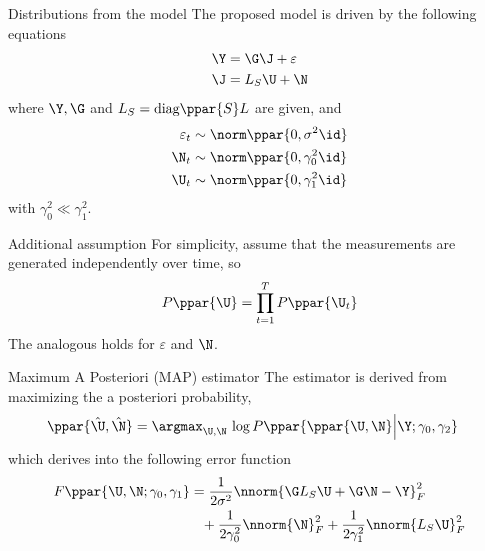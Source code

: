  {Distributions from the model}
The proposed model is driven by the following equations
\begin{align}
    \Y &= \G \J + \varepsilon \\
    \J &=  L_S \U + \N
\end{align}
where $\Y, \G$ and $L_S = \text{diag}\ppar{S} L$ are given, and
\begin{align}
    \varepsilon_t &\sim  \norm\ppar{0, \sigma^2 \id } \\
    \N_t &\sim  
    \norm\ppar{0, \gamma_0^2 \id } \\
    \U_t &\sim  
    \norm\ppar{0, \gamma_1^2 \id } 
\end{align}
with $\gamma_0^2 \ll \gamma_1^2$.
 


 {Additional assumption}
For simplicity, assume that
the measurements are generated independently over time, so
\begin{equation}
    P\ppar{ \U } = \prod_{t=1}^T P\ppar{ \U_t }
\end{equation}
The analogous holds for $\varepsilon$ and $\N$.
 

 {Maximum A Posteriori (MAP) estimator}
The estimator is derived from maximizing the a posteriori probability,
\begin{align}
    \ppar{ \hat{\U}, \hat{\N} } &=
    \argmax_{\U, \N }\,
    \log P\ppar{\ppar{ {\U}, {\N} } \Big| {\Y; \gamma_0, \gamma_2} }
\end{align}
which derives into the following error function
\begin{align}
    F\ppar{ {\U}, {\N};  \gamma_0, \gamma_1} &=
    \frac{1}{2\sigma^2}
    \nnorm{\G L_S \U + \G \N - \Y}_F^2
    \nonumber \\
    &\phantom{=}
    +
    \frac{1}{2\gamma_0^2} \nnorm{\N}_F^2
    +
    \frac{1}{2\gamma_1^2} \nnorm{L_S \U}_F^2
\end{align}
 


